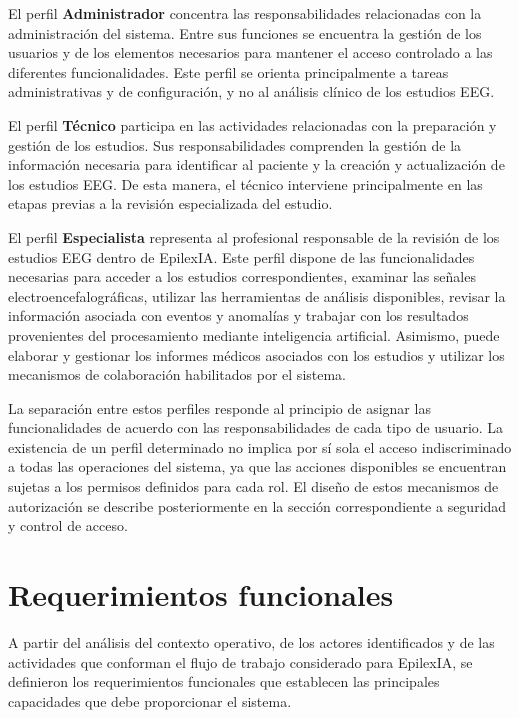 El perfil \textbf{Administrador} concentra las responsabilidades relacionadas
con la administración del sistema. Entre sus funciones se encuentra la gestión
de los usuarios y de los elementos necesarios para mantener el acceso
controlado a las diferentes funcionalidades. Este perfil se orienta
principalmente a tareas administrativas y de configuración, y no al análisis
clínico de los estudios EEG.

El perfil \textbf{Técnico} participa en las actividades relacionadas con la
preparación y gestión de los estudios. Sus responsabilidades comprenden la
gestión de la información necesaria para identificar al paciente y la creación
y actualización de los estudios EEG. De esta manera, el técnico interviene
principalmente en las etapas previas a la revisión especializada del estudio.

El perfil \textbf{Especialista} representa al profesional responsable de la
revisión de los estudios EEG dentro de EpilexIA. Este perfil dispone de las
funcionalidades necesarias para acceder a los estudios correspondientes,
examinar las señales electroencefalográficas, utilizar las herramientas de
análisis disponibles, revisar la información asociada con eventos y anomalías
y trabajar con los resultados provenientes del procesamiento mediante
inteligencia artificial. Asimismo, puede elaborar y gestionar los informes
médicos asociados con los estudios y utilizar los mecanismos de colaboración
habilitados por el sistema.

La separación entre estos perfiles responde al principio de asignar las
funcionalidades de acuerdo con las responsabilidades de cada tipo de usuario.
La existencia de un perfil determinado no implica por sí sola el acceso
indiscriminado a todas las operaciones del sistema, ya que las acciones
disponibles se encuentran sujetas a los permisos definidos para cada rol. El
diseño de estos mecanismos de autorización se describe posteriormente en la
sección correspondiente a seguridad y control de acceso.

\section{Requerimientos funcionales}
\label{sec:requerimientos-funcionales}

A partir del análisis del contexto operativo, de los actores identificados y
de las actividades que conforman el flujo de trabajo considerado para
EpilexIA, se definieron los requerimientos funcionales que establecen las
principales capacidades que debe proporcionar el sistema.

